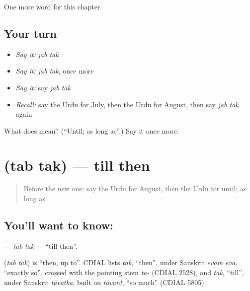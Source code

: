 \begin{grammarlens}[title={What you've built}]
One more word for this chapter.
\end{grammarlens}

\subsection*{Your turn}
\begin{itemize}
\raggedright
  \item \emph{Say it:} \emph{jab tak}
  \item \emph{Say it:} \emph{jab tak}, once more
  \item \emph{Say it:} say \emph{jab tak}
  \item \emph{Recall:} say the Urdu for July, then the Urdu for August, then say \emph{jab tak} again
\end{itemize}

\begin{tcolorbox}[breakable,colback=teal!4,colframe=teal!35!black,title={Before you move on}]
What does   mean? (\textquotedblleft{}Until; as long as\textquotedblright{}.) Say it once more.
\end{tcolorbox}
\section[\texorpdfstring{\ur{تب} \ur{تک} (tab tak)}{تب تک (tab tak)}]{  (tab tak) — till then}

\label{lesson:UR-C189-tab-tak}



\begin{quote}
Before the new one: say the Urdu for August, then the Urdu for until; as long as.
\end{quote}

\subsection*{You'll want to know:  }
\textbf{ } — \emph{tab tak} — \textquotedblleft{}till then\textquotedblright{}.

\begin{cousinweb}
\textbf{ } (\emph{tab tak}) is \textquotedblleft{}then, up to\textquotedblright{}. CDIAL lists \emph{tab}, \textquotedblleft{}then\textquotedblright{}, under Sanskrit \emph{evam eva}, \textquotedblleft{}exactly so\textquotedblright{}, crossed with the pointing stem \emph{ta-} (CDIAL 2528), and \emph{tak}, \textquotedblleft{}till\textquotedblright{}, under Sanskrit \emph{tāvatka}, built on \emph{tāvant}, \textquotedblleft{}so much\textquotedblright{} (CDIAL 5805).
\end{cousinweb}


